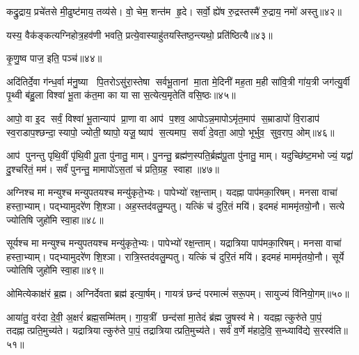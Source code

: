 कद्रु॒द्राय॒ प्रचे॑तसे मी॒ढुष्ट॑माय॒ तव्य॑से। वो॒ चेम॒ शन्त॑म हृ॒दे। सर्वो॒ ह्ये॑ष रु॒द्रस्तस्मै॑ रु॒द्राय॒ नमो॑ अस्तु॥४२॥
\anuvakamend

यस्य॒ वैक॑ङ्कत्यग्निहोत्र॒हव॑णी भवति॒ प्रत्ये॒वास्याहु॑तय\-स्तिष्ठ॒न्त्यथो॒ प्रति॑ष्ठित्यै॥४३॥
\anuvakamend


कृ॒णु॒ष्व पाज॒ इति॒ पञ्च॑॥४४॥
\anuvakamend

अदि॑तिर्दे॒वा ग॑न्ध॒र्वा म॑नु॒ष्या पि॒तरोऽसु॑रा॒स्तेषा सर्वभू॒तानां मा॒ता मे॒दिनी॑ मह॒ता म॒ही सा॑वि॒त्री गा॑य॒त्री जग॑त्यु॒र्वी पृ॒थ्वी ब॑हु॒ला विश्वा॑ भू॒ता क॑त॒मा का या सा स॒त्येत्य॒मृतेति॑ वसि॒ष्ठः॥४५॥
\anuvakamend

आपो॒ वा इ॒द सर्वं॒ विश्वा॑ भू॒तान्याप॑ प्रा॒णा वा आप॑ प॒शव॒ आपोऽन्न॒मापोऽमृ॑त॒माप॑ स॒म्राडापो॑ वि॒राडाप॑ स्व॒राडाप॒श्छन्दा॒स्यापो॒ ज्योती॒ष्यापो॒ यजू॒ष्याप॑ स॒त्यमाप॒ सर्वा॑ दे॒वता॒ आपो॒ भूर्भुव॒ सुव॒राप॒ ओम्॥४६॥
\anuvakamend

आप॑ पुनन्तु पृथि॒वीं पृ॑थि॒वी पू॒ता पु॑नातु॒ माम्। पु॒नन्तु॒ ब्रह्म॑ण॒स्पति॒र्ब्रह्म॑पू॒ता पु॑नातु॒ माम्। यदुच्छि॑ष्ट॒मभोज्यं॒ यद्वा॑ दु॒श्चरि॑तं॒ मम॑। सर्वं॑ पुनन्तु॒ मामापो॑ऽस॒तां च॑ प्रति॒ग्रह॒ स्वाहा॥४७॥
\anuvakamend


अग्निश्च मा मन्युश्च मन्युपतयश्च मन्यु॑कृते॒भ्यः। पापेभ्यो॑ रक्ष॒न्ताम्। यदह्ना पाप॑मका॒रिषम्। मनसा वाचा॑ हस्ता॒भ्याम्। पद्भ्यामुदरे॑ण शि॒श्ञा। अह॒स्तद॑वलु॒म्पतु। यत्किं च॑ दुरि॒तं मयि॑। इदमहं माममृ॑तयो॒नौ। सत्ये ज्योतिषि जुहो॑मि स्वा॒हा॥४८॥
\anuvakamend


सूर्यश्च मा मन्युश्च मन्युपतयश्च मन्यु॑कृते॒भ्यः। पापेभ्यो॑ रक्ष॒न्ताम्। यद्रात्रिया पाप॑मका॒रिषम्। मनसा वाचा॑ हस्ता॒भ्याम्। पद्भ्यामुदरे॑ण शि॒श्ञा। रात्रि॒स्तद॑वलु॒म्पतु। यत्किं च॑ दुरि॒तं मयि॑। इदमहं माममृ॑तयो॒नौ। सूर्ये ज्योतिषि जुहो॑मि स्वा॒हा॥४९॥
\anuvakamend

ओमित्येकाक्ष॑रं ब्र॒ह्म। अग्निर्देवता ब्रह्म॑ इत्या॒र्\mbox{}षम्। गायत्रं छन्दं परमात्मं॑ सरू॒पम्। सायुज्यं वि॑नियो॒गम्॥५०॥
\anuvakamend

आया॑तु॒ वर॑दा दे॒वी॒ अ॒क्षरं॑ ब्रह्म॒सम्मि॑तम्। गा॒य॒त्रीं छन्द॑सां मा॒तेदं ब्र॑ह्म जु॒षस्व॑ मे। यदह्नात्कुरु॑ते पा॒पं॒ तदह्नात्प्रति॒मुच्य॑ते। यद्रात्रियात्कुरु॑ते पा॒पं॒ तद्रात्रियात्प्रति॒मुच्य॑ते। सर्व॑ व॒र्णे म॑हादे॒वि॒ स॒न्ध्यावि॑द्ये स॒रस्व॑ति॥५१॥ 
\anuvakamend


